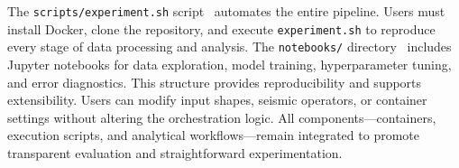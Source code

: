 The \texttt{scripts/experiment.sh} script~\cite{delucca2025experiment2script} automates the entire pipeline.
Users must install Docker, clone the repository, and execute \texttt{experiment.sh} to reproduce every stage of data processing and analysis.
The \texttt{notebooks/} directory~\cite{delucca2025experiment2notebooks} includes Jupyter notebooks for data exploration, model training, hyperparameter tuning, and error diagnostics.
This structure provides reproducibility and supports extensibility.
Users can modify input shapes, seismic operators, or container settings without altering the orchestration logic.
All components—containers, execution scripts, and analytical workflows—remain integrated to promote transparent evaluation and straightforward experimentation.